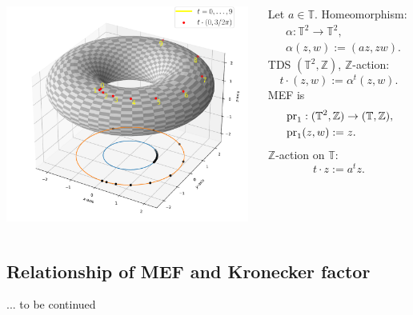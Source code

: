 \begin{frame}
  \begin{columns}
    \begin{column}{0.6\textwidth}
    \centering
      \includegraphics[width=8cm]{imgs/torusSkewRot.pdf}
    \end{column}
    \begin{column}{0.4\textwidth}
  \begin{example}
Let $a \in \mathbb{T}$. Homeomorphism:
\begin{equation*}
  \begin{split}
    &\alpha: \mathbb{T}^2 \to \mathbb{T}^2,\\
  &\alpha (z,w) := (az,zw).
  \end{split}
  \end{equation*}
     TDS $(\mathbb{T}^2,\mathbb{Z})$, $\mathbb{Z}$-action:
     \begin{equation*}
     t \cdot (z,w) := \alpha^t (z,w).
     \end{equation*}
     \pause
  MEF is 
  \begin{equation*}
    \begin{split}
     &\operatorname{pr}_1 : (\mathbb{T}^2,\mathbb{Z}) \to (\mathbb{T},\mathbb{Z}), \\
    &\operatorname{pr}_1 (z,w) := z.
    \end{split}
  \end{equation*}
  $\mathbb{Z}$-action on $\mathbb{T}$:
  \begin{equation*}
   t\cdot  z := a^tz.
  \end{equation*}
\end{example}
       \end{column}
  \end{columns}
\end{frame}
\subsection{Relationship of MEF and Kronecker factor}
\begin{frame}
  ... to be continued
\end{frame}

